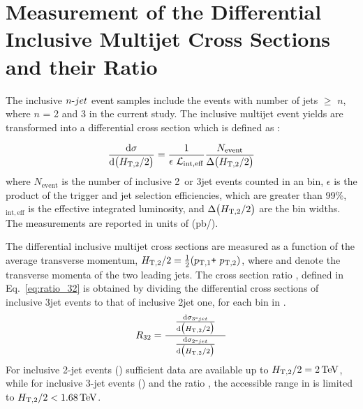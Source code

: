 \chapter{Measurement of the Differential Inclusive Multijet Cross Sections and their Ratio}
\label{chap:measurement}
The inclusive $n\mbox{-} jet$ event samples include the events with number of jets $\geq$ $n$, where $n$ = 2 and 3 in the current study. The inclusive multijet event yields are transformed into a differential cross section which is defined as :

\begin{equation}
 \label{eq:inclusive_formula}
 {\dd{\sigma}{\big(\httwo\big)}} = \frac{1}{\epsilon~\lumi_{\mathrm{int,eff}}}\frac{N_\mathrm{event}}{\Delta\big(\httwo\big)}
\end{equation}
where $N_\mathrm{event}$ is the number of inclusive 2\hy~or 3\hy jet events counted in an \httwo bin, $\epsilon$ is the product of the trigger and jet selection efficiencies, which are greater than 99\%, \lumins$_{\mathrm{int,eff}}$ is the effective integrated luminosity, and $ \Delta\big(H_{\mathrm{T,2}}/2\big)$ are the bin widths. The measurements are reported in units of (pb/\GeV).

The differential inclusive multijet cross sections are measured as a function of the average transverse momentum, $\httwo = \frac{1}{2}(\ptone\plus \pttwo)$, where \ptone and \pttwo denote the transverse momenta of the two leading jets. The cross section ratio \ratio, defined in Eq.~\ref{eq:ratio_32} is obtained by dividing the differential cross sections of inclusive 3\hy jet events to that of inclusive 2\hy jet one, for each bin in \httwo.
\begin{equation}
 \label{eq:ratio_32}
 \ratio = \frac[10pt]{{\dd{\sigma_{3\hy jet}}{\big(\httwo\big)}}}{\dd{\sigma_{2\hy jet}}{\big(\httwo\big)}}
\end{equation}
For inclusive 2-jet events (\njt) sufficient data are available up to $H_{\mathrm{T,2}}/2 = 2\,\text{Te\hspace{-.08em}V}$, while for inclusive 3-jet events (\njth) and the ratio \ratio, the accessible range in \httwo is limited to $H_{\mathrm{T,2}}/2 < 1.68\,\text{Te\hspace{-.08em}V}$.

